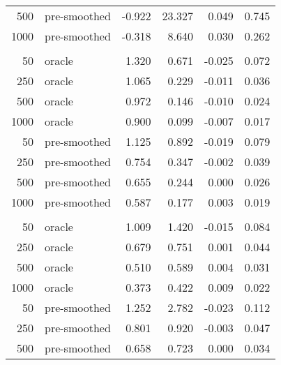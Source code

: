 \documentclass[useAMS,usenatbib,referee]{biom}
\begin{document}
\begin{table}[t]
\begin{tabular}{rlrrrr}
\hspace{1em}500 & pre-smoothed & -0.922 & 23.327 & 0.049 & 0.745\\
\hspace{1em}1000 & pre-smoothed & -0.318 & 8.640 & 0.030 & 0.262\\
\addlinespace[0.3em]
\multicolumn{6}{l}{\textbf{Kernel}}\\
\hspace{1em}50 & oracle & 1.320 & 0.671 & -0.025 & 0.072\\
\hspace{1em}250 & oracle & 1.065 & 0.229 & -0.011 & 0.036\\
\hspace{1em}500 & oracle & 0.972 & 0.146 & -0.010 & 0.024\\
\hspace{1em}1000 & oracle & 0.900 & 0.099 & -0.007 & 0.017\\
\hspace{1em}50 & pre-smoothed & 1.125 & 0.892 & -0.019 & 0.079\\
\hspace{1em}250 & pre-smoothed & 0.754 & 0.347 & -0.002 & 0.039\\
\hspace{1em}500 & pre-smoothed & 0.655 & 0.244 & 0.000 & 0.026\\
\hspace{1em}1000 & pre-smoothed & 0.587 & 0.177 & 0.003 & 0.019\\
\addlinespace[0.3em]
\multicolumn{6}{l}{\textbf{Linear}}\\
\hspace{1em}50 & oracle & 1.009 & 1.420 & -0.015 & 0.084\\
\hspace{1em}250 & oracle & 0.679 & 0.751 & 0.001 & 0.044\\
\hspace{1em}500 & oracle & 0.510 & 0.589 & 0.004 & 0.031\\
\hspace{1em}1000 & oracle & 0.373 & 0.422 & 0.009 & 0.022\\
\hspace{1em}50 & pre-smoothed & 1.252 & 2.782 & -0.023 & 0.112\\
\hspace{1em}250 & pre-smoothed & 0.801 & 0.920 & -0.003 & 0.047\\
\hspace{1em}500 & pre-smoothed & 0.658 & 0.723 & 0.000 & 0.034\\

\end{tabular}
\end{table}
\end{document}
